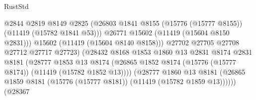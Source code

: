\begin{lexlean}{RustStd}
\begin{coremodule}
                                              @2844
                                              @2819
                                              @8149
                                              @2825
                                              (@26803
                                                @1841
                                                @8155
                                                (@15776 (@15777 @8155))
                                                (@11419 (@15782 @1841 @53)))
                                              @26771
                                              @15602
                                              (@11419 (@15604 @8150 @2831)))
                                            @15602
                                            (@11419 (@15604 @8140 @8158)))
                                          @27702
                                          @27705
                                          @27708
                                          @27712
                                          @27717
                                          @27723)
                                        (@28432
                                          @8168
                                          @1853
                                          @1860
                                          @13
                                          @2831
                                          @8174
                                          @2831
                                          @8181
                                          (@28777
                                            @1853
                                            @13
                                            @8174
                                            (@26865
                                              @1852
                                              @8174
                                              (@15776 (@15777 @8174))
                                              (@11419 (@15782 @1852 @13))))
                                          (@28777
                                            @1860
                                            @13
                                            @8181
                                            (@26865
                                              @1859
                                              @8181
                                              (@15776 (@15777 @8181))
                                              (@11419 (@15782 @1859 @13))))))
                                      (@28367

\end{coremodule}
\end{lexlean}
